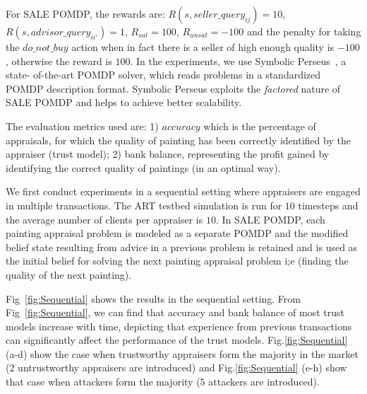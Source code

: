 \documentclass{aamas2014}
\providecommand{\SALEP}{SALE POMDP}
\begin{document}
For \SALEP{}, the rewards are: $R(s,seller\_query_{ij})=10$, $R(s,advisor\_query_{ii'})=1$, $R_{sat}=100$, $R_{unsat}=-100$ and the penalty for taking the $do\_not\_buy$ action when in fact there is a seller of high enough quality is $-100$, otherwise the reward is $100$. In the experiments, we use Symbolic Perseus~\cite{poupart2005exploiting}, a state- of-the-art POMDP solver, which reads problems in a standardized POMDP description format. Symbolic Perseus exploits the \textit{factored} nature of  \SALEP{} and helps to achieve better scalability.

The evaluation metrics used are: 1) $accuracy$ which is the percentage of  appraisals, for which the quality of painting has been correctly identified by the appraiser (trust model); 2) bank balance, representing the profit gained by identifying the correct quality of paintings (in an optimal way).

We first conduct experiments in a sequential setting where appraisers are engaged in multiple transactions. The ART testbed simulation is run for $10$ timesteps and the average number of clients per appraiser is $10$. In \SALEP{}, each painting appraisal problem is modeled as a separate POMDP and the modified belief state resulting from advice in a previous problem is retained and is used as the initial belief for solving the next painting appraisal problem i;e (finding the quality of the next painting).

 Fig~\ref{fig:Sequential} shows the results in the sequential setting. From Fig~\ref{fig:Sequential}, we can find that accuracy and bank balance of most trust models increase with time, depicting that experience from previous transactions can significantly affect the performance of the trust models. Fig.\ref{fig:Sequential} (a-d) show the case when trustworthy appraisers form the majority in the market ($2$ untrustworthy appraisers are introduced) and  Fig.\ref{fig:Sequential} (e-h) show that case when attackers form the majority ($5$ attackers are introduced).
\end{document}
